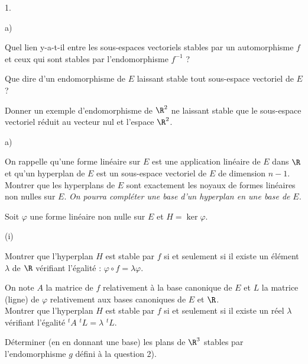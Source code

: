 \documentclass[11pt]{article}%
\begin{document}
\begin{noliste}{1.}
\begin{noliste}{a)}
\item Quel lien y-a-t-il entre les sous-espaces vectoriels stables par
un
automorphisme $f$ et ceux qui sont stables par l'endomorphisme $f^{-1}$
?

\item Que dire d'un endomorphisme de $E$ laissant stable tout
sous-espace
vectoriel de $E$ ?

\item Donner un exemple d'endomorphisme de $\R^{2}$ ne laissant
stable que le sous-espace vectoriel réduit au vecteur nul et l'espace
$\R^{2}$.
\end{noliste}

\item 

\begin{noliste}{a)}
 \setlength{\itemsep}{2mm}
\item On rappelle qu'une forme linéaire sur $E$ est une application
linéaire
de $E$ dans $\R$ et qu'un hyperplan de $E$ est un sous-espace
vectoriel de $E$ de dimension $n-1$.\\
Montrer que les hyperplans de $E$ sont exactement les noyaux de formes
linéaires non nulles sur $E$. \textit{On pourra compléter une base d'un
hyperplan en une base de }$E$\textit{. }

\item Soit $\varphi $ une forme linéaire non nulle sur $E$ et $H = \ker
\varphi $.

\begin{nonoliste}{(i)}
\item Montrer que l'hyperplan $H$ est stable par $f$ si et seulement si
il
existe un élément $\lambda $ de $\R$ vérifiant l'égalité : $\varphi
\circ f = \lambda \varphi $.

\item On note $A$ la matrice de $f$ relativement à la base canonique de
$E$
et $L$ la matrice (ligne) de $\varphi $ relativement aux bases
canoniques de 
$E$ et $\R$.\\
Montrer que l'hyperplan $H$ est stable par $f$ si et seulement si il
existe
un réel $\lambda $ vérifiant l'égalité $^{t}A$ $^{t}L = \lambda $
$^{t}L$.
\end{nonoliste}

\item Déterminer (en en donnant une base) les plans de $\R^{3}$
stables par l'endomorphisme $g$ défini à la question 2).
\end{noliste}
\end{noliste}
\end{document}
